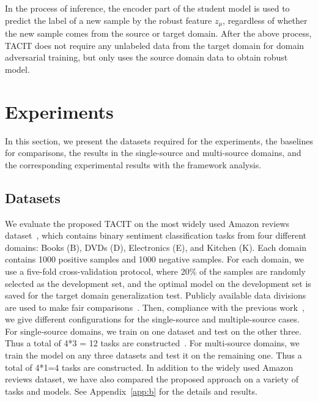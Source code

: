 \documentclass[letterpaper]{article} %
\begin{document}
In the process of inference, the encoder part of the student model is used to predict the label of a new sample by the robust feature $z_\mu$, regardless of whether the new sample comes from the source or target domain. After the above process, TACIT does not require any unlabeled data from the target domain for domain adversarial training, but only uses the source domain data to obtain robust model. 

\section{Experiments}\label{sec:exp}
In this section, we present the datasets required for the experiments, the baselines for comparisons, the results in the single-source and multi-source domains, and the corresponding experimental results with the framework analysis. 

\subsection{Datasets}\label{sec:data}

We evaluate the proposed TACIT on the most widely used Amazon reviews dataset~\cite{BlitzerDP07}, which contains binary sentiment classification tasks from four different domains: Books (B), DVDs (D), Electronics (E), and Kitchen (K). Each domain contains 1000 positive samples and 1000 negative samples. For each domain, we use a five-fold cross-validation protocol, where 20\% of the samples are randomly selected as the development set, and the optimal model on the development set is saved for the target domain generalization test. Publicly available data divisions are used to make fair comparisons~\cite{Ben-DavidRR20}. Then, compliance with the previous work~\cite{WuS22}, we give different configurations for the single-source and multiple-source cases. For single-source domains, we train on one dataset and test on the other three. Thus a total of 4*3 = 12 tasks are constructed~\cite{ZiserR18}. For multi-source domains, we train the model on any three datasets and test it on the remaining one. Thus a total of 4*1=4 tasks are constructed. In addition to the widely used Amazon reviews dataset, we have also compared the proposed approach on a variety of tasks and models. See Appendix~\ref{app:b} for the details and results.
\end{document}
